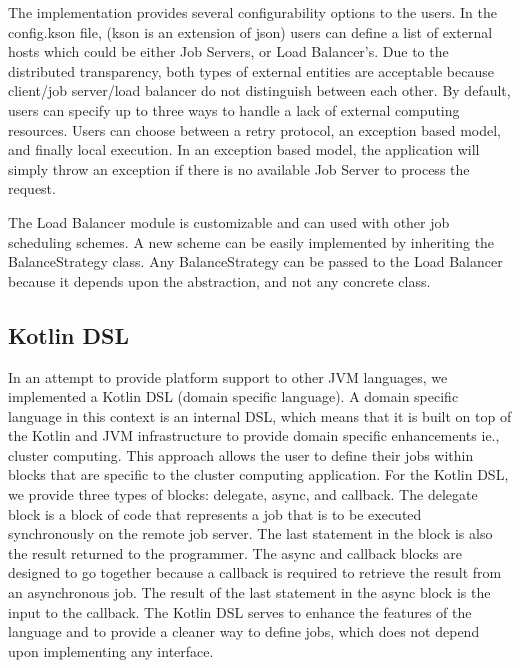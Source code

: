 The implementation provides several configurability options to the users.
In the config.kson file, (kson is an extension of json) users can
define a list of external hosts which could be either Job Servers,
or Load Balancer's.
Due to the distributed transparency, both types of external entities
are acceptable because client/job server/load balancer do
not distinguish between each other.
By default, users can specify up to three ways to handle
a lack of external computing resources.
Users can choose between a retry protocol, an exception based model,
and finally local execution.
In an exception based model, the application will simply throw
an exception if there is no available Job Server
to process the request.

The Load Balancer module is customizable and can used with other
job scheduling schemes.
A new scheme can be easily implemented by inheriting the BalanceStrategy
class.
Any BalanceStrategy can be passed to the Load Balancer because it depends upon
the abstraction, and not any concrete class.

\subsection{Kotlin DSL}\label{subsec:kotlinDsl}

In an attempt to provide platform support to other JVM languages, we
implemented a Kotlin DSL (domain specific language).
A domain specific language in this context is an internal DSL, which
means that it is built on top of the Kotlin and JVM infrastructure
to provide domain specific enhancements ie., cluster computing.
This approach allows the user to define their jobs within blocks
that are specific to the cluster computing application.
For the Kotlin DSL, we provide three types of blocks:
delegate, async, and callback.
The delegate block is a block of code that represents a job
that is to be executed synchronously on the remote job server.
The last statement in the block is also the result returned to the
programmer.
The async and callback blocks are designed to go together because
a callback is required to retrieve the result from an asynchronous
job.
The result of the last statement in the async block is the input
to the callback.
The Kotlin DSL serves to enhance the features of the language and to
provide a cleaner way to define jobs, which does not depend upon
implementing any interface.
